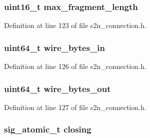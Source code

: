 \subsubsection[{\texorpdfstring{max\+\_\+fragment\+\_\+length}{max_fragment_length}}]{\setlength{\rightskip}{0pt plus 5cm}uint16\+\_\+t max\+\_\+fragment\+\_\+length}\hypertarget{structs2n__connection_aeb12fafca93fad21fd9b32d31f192ea6}{}\label{structs2n__connection_aeb12fafca93fad21fd9b32d31f192ea6}


Definition at line 123 of file s2n\+\_\+connection.\+h.

\subsubsection[{\texorpdfstring{wire\+\_\+bytes\+\_\+in}{wire_bytes_in}}]{\setlength{\rightskip}{0pt plus 5cm}uint64\+\_\+t wire\+\_\+bytes\+\_\+in}\hypertarget{structs2n__connection_ae40976768561ff646c1b9badadcd4f4e}{}\label{structs2n__connection_ae40976768561ff646c1b9badadcd4f4e}


Definition at line 126 of file s2n\+\_\+connection.\+h.

\subsubsection[{\texorpdfstring{wire\+\_\+bytes\+\_\+out}{wire_bytes_out}}]{\setlength{\rightskip}{0pt plus 5cm}uint64\+\_\+t wire\+\_\+bytes\+\_\+out}\hypertarget{structs2n__connection_ad34101c7be957b19718d9e9047e1af39}{}\label{structs2n__connection_ad34101c7be957b19718d9e9047e1af39}


Definition at line 127 of file s2n\+\_\+connection.\+h.

\subsubsection[{\texorpdfstring{closing}{closing}}]{\setlength{\rightskip}{0pt plus 5cm}sig\+\_\+atomic\+\_\+t closing}\hypertarget{structs2n__connection_afaf913ae0bd2fe2866608f51060791a2}{}\label{structs2n__connection_afaf913ae0bd2fe2866608f51060791a2}


